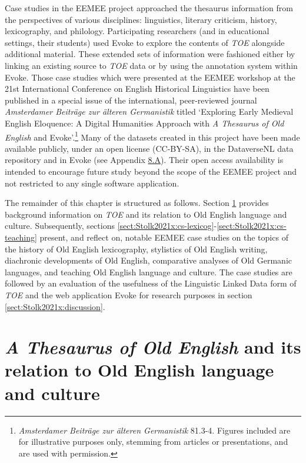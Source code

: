 Case studies in the EEMEE project approached the thesaurus information from the perspectives of various disciplines: linguistics, literary criticism, history, lexicography, and philology. Participating researchers (and in educational settings, their students) used Evoke to explore the contents of \textit{TOE} alongside additional material. These extended sets of information were fashioned either by linking an existing source to \textit{TOE} data or by using the annotation system within Evoke. Those case studies which were presented at the EEMEE workshop at the 21st International Conference on English Historical Linguistics %
have been published in a special issue of the international, peer-reviewed journal \textit{Amsterdamer Beiträge zur älteren Germanistik} titled `Exploring Early Medieval English Eloquence: A Digital Humanities Approach with \emph{A Thesaurus of Old English} and Evoke'.\footnote{\textit{Amsterdamer Beiträge zur älteren Germanistik} 81.3-4. Figures included are for illustrative purposes only, stemming from articles or presentations, and are used with permission.} Many of the datasets created in this project have been made available publicly, under an open license (CC-BY-SA), in the DataverseNL data repository and in Evoke (see Appendix \hyperref[Appendix8.A]{8.A}). Their open access availability is intended to encourage future study beyond the scope of the EEMEE project and not restricted to any single software application.

The remainder of this chapter is structured as follows. 
Section \ref{sect:Stolk2021x:toe} provides background information on \textit{TOE} and its relation to Old English language and culture.
Subsequently, sections \ref{sect:Stolk2021x:cs-lexicog}-\ref{sect:Stolk2021x:cs-teaching} present, and reflect on, notable EEMEE case studies on the topics of the history of Old English lexicography, stylistics of Old English writing, diachronic developments of Old English, comparative analyses of Old Germanic languages, and teaching Old English language and culture. The case studies are followed by an evaluation of the usefulness of the Linguistic Linked Data form of \textit{TOE} and the web application Evoke for research purposes in section \ref{sect:Stolk2021x:discussion}. 




\section{\emph{A Thesaurus of Old English} and its relation to Old English language and culture}
\label{sect:Stolk2021x:toe}

